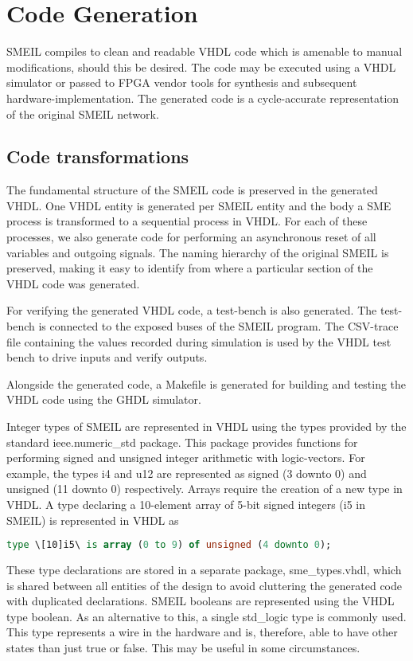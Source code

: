 \chapter{Code Generation}
\label{sec:codegen}
SMEIL compiles to clean and readable VHDL code which is amenable to manual
modifications, should this be desired. The code may be executed using a VHDL
simulator or passed to FPGA vendor tools for synthesis and subsequent
hardware-implementation. The generated code is a cycle-accurate representation
of the original SMEIL network.

\section{Code transformations}

The fundamental structure of the SMEIL code is preserved in the generated
VHDL. One VHDL entity is generated per SMEIL entity and the body a SME process
is transformed to a sequential process in VHDL. For each of these processes, we
also generate code for performing an asynchronous reset of all variables and
outgoing signals. The naming hierarchy of the original SMEIL is preserved,
making it easy to identify from where a particular section of the VHDL code was
generated.

For verifying the generated VHDL code, a test-bench is also generated. The
test-bench is connected to the {\ttfamily exposed} buses of the SMEIL program. The
CSV-trace file containing the values recorded during simulation is used by the
VHDL test bench to drive inputs and verify outputs.

Alongside the generated code, a {\ttfamily Makefile} is generated for building
and testing the VHDL code using the GHDL simulator.

Integer types of SMEIL are represented in VHDL using the types provided by the
standard {\ttfamily ieee.numeric\_std} package. This package provides functions for
performing signed and unsigned integer arithmetic with logic-vectors. For
example, the types {\ttfamily i4} and {\ttfamily u12} are represented as {\ttfamily signed (3
  downto 0)} and {\ttfamily unsigned (11 downto 0)} respectively. Arrays require the
creation of a new {\ttfamily type} in VHDL. A {\ttfamily type} declaring a 10-element array
of 5-bit signed integers ({\ttfamily [10]i5} in SMEIL) is represented in VHDL as
\begin{lstlisting}[language=vhdl]
type \[10]i5\ is array (0 to 9) of unsigned (4 downto 0);
\end{lstlisting}
These type declarations are stored in a separate package, {\ttfamily sme\_types.vhdl},
which is shared between all entities of the design to avoid cluttering the
generated code with duplicated declarations. SMEIL booleans are represented
using the VHDL type {\ttfamily boolean}. As an alternative to this, a single {\ttfamily
  std\_logic} type is commonly used. This type represents a wire in the hardware
and is, therefore, able to have other states than just true or false. This may
be useful in some circumstances.

